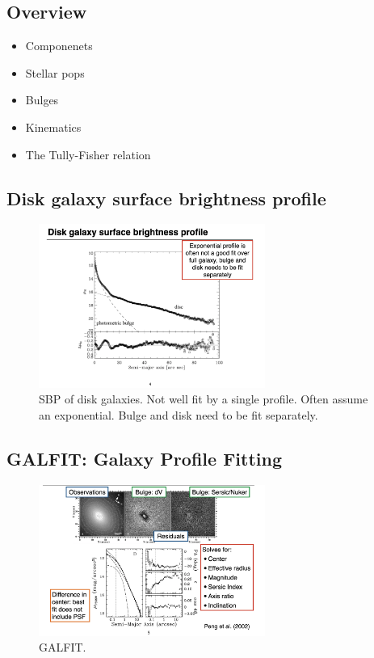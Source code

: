 \documentclass{article}
\begin{document}
\subsection{Overview}

\begin{itemize}
    \item Componenets
    \item Stellar pops
    \item Bulges
    \item Kinematics
    \item The Tully-Fisher relation
\end{itemize}

\subsection{Disk galaxy surface brightness profile}

\begin{figure}
    \centering
    \includegraphics[width=0.66\textwidth]{figs/Screen Shot 2021-10-22 at 9.46.50 AM.png}
    \caption{SBP of disk galaxies. Not well fit by a single profile. Often assume an exponential. Bulge and disk need to be fit separately.}
    \label{fig:sbp}
\end{figure}

\subsection{GALFIT: Galaxy Profile Fitting}

\begin{figure}
    \centering
    \includegraphics[width=0.66\textwidth]{figs/Screen Shot 2021-10-22 at 9.48.29 AM.png}
    \caption{GALFIT.}
    \label{fig:GALFIT}
\end{figure}
\end{document}
